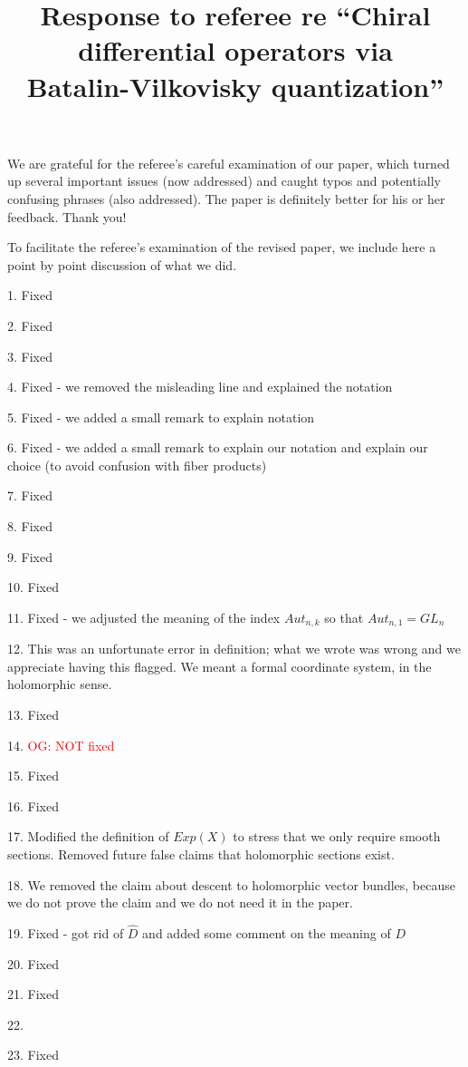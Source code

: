 \documentclass[10pt]{amsart}
\title{Response to referee re ``Chiral differential operators via\\Batalin-Vilkovisky quantization''}
\def\owen{\textcolor{red}{OG: }\textcolor{red}}
\begin{document}
\maketitle

We are grateful for the referee's careful examination of our paper, which turned up several important issues (now addressed) and caught typos and potentially confusing phrases (also addressed).
The paper is definitely better for his or her feedback.
Thank you!

To facilitate the referee's examination of the revised paper, 
we include here a point by point discussion of what we did.

1. Fixed

2. Fixed

3. Fixed

4. Fixed - we removed the misleading line and explained the notation

5. Fixed - we added a small remark to explain notation

6. Fixed - we added a small remark to explain our notation and explain our choice (to avoid confusion with fiber products)

7. Fixed

8. Fixed

9. Fixed

10. Fixed

11. Fixed - we adjusted the meaning of the index $Aut_{n,k}$ so that $Aut_{n,1} = GL_n$

12. This was an unfortunate error in definition; what we wrote was wrong and we appreciate having this flagged. We meant a formal coordinate system, in the holomorphic sense. 

13. Fixed

14. \owen{NOT fixed}


15. Fixed

16. Fixed

17. Modified the definition of $Exp(X)$ to stress that we only require smooth sections. 
Removed future false claims that holomorphic sections exist.

18. We removed the claim about descent to holomorphic vector bundles, because we do not prove the claim and we do not need it in the paper.

19. Fixed - got rid of $\hat{D}$ and added some comment on the meaning of $D$

20. Fixed

21. Fixed

22.

23. Fixed
\end{document}

